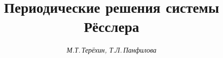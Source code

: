 

 


%  


 


\newcommand{\col}{\operatorname{col}} 


\newcommand{\tts}[1]{} 


 




  


\setcounter{page}{70} 












 


\author{\it М.Т.\,Тер\"ехин, Т.Л.\,Панфилова} 




\title{Периодические решения системы Р\"е{}сслера} 


 


\date{} 




\pagestyle{plain} %


 




\maketitle 


\label{begin} 


